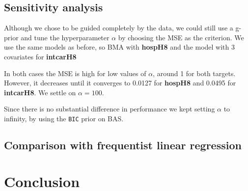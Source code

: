\documentclass[12pt,a4paper]{article}
\theoremstyle{definition}
\theoremstyle{remark}
\begin{document}
\newpage
\subsection{Sensitivity analysis}
Although we chose to be guided completely by the data,  we could still use a g-prior and tune the hyperparameter $\alpha$ by choosing the MSE as the criterion. We use the same models as before, so BMA with \textbf{hospH8} and the model with 3 covariates for \textbf{intcarH8}

In both cases the MSE is high for low values of $\alpha$, around 1 for both targets. However, it decreases until it converges to 0.0127 for \textbf{hospH8} and 0.0495 for \textbf{intcarH8}. We settle on $\alpha = 100$. 

Since there is no substantial difference in performance we kept setting $\alpha$ to infinity, by using the \texttt{BIC} prior on BAS.

\subsection{Comparison with frequentist linear regression}
\newpage
\section{Conclusion}
\end{document}
